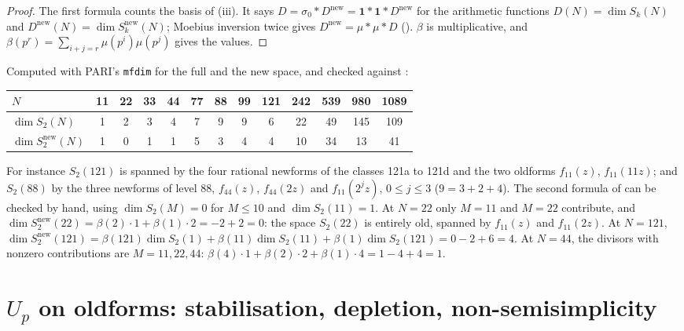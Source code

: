\begin{proof}
The first formula counts the basis of (iii). It says $D=\sigma_0*D^{\mathrm{new}}=\mathbf1*\mathbf1*D^{\mathrm{new}}$ for the arithmetic functions $D(N)=\dim S_k(N)$ and
$D^{\mathrm{new}}(N)=\dim S_k^{\mathrm{new}}(N)$; Moebius inversion twice gives $D^{\mathrm{new}}=\mu*\mu*D$ (). $\beta$ is multiplicative, and $\beta(p^r)=\sum_{i+j=r}\mu(p^i)\mu(p^j)$ gives the values.
\end{proof}

\begin{example}\label{ex:hecke:dimensions}
Computed with PARI's \texttt{mfdim} for the full and the new space, and checked against :
\begin{center}
\begin{tabular}{lcccccccccccc}
\toprule
$N$ & 11 & 22 & 33 & 44 & 77 & 88 & 99 & 121 & 242 & 539 & 980 & 1089\\
\midrule
$\dim S_2(N)$ & 1 & 2 & 3 & 4 & 7 & 9 & 9 & 6 & 22 & 49 & 145 & 109\\
$\dim S_2^{\mathrm{new}}(N)$ & 1 & 0 & 1 & 1 & 5 & 3 & 4 & 4 & 10 & 34 & 13 & 41\\
\bottomrule
\end{tabular}
\end{center}
For instance $S_2(121)$ is spanned by the four rational newforms of the classes 121a to 121d and the two oldforms $f_{11}(z)$, $f_{11}(11z)$; and $S_2(88)$ by the three newforms of
level $88$, $f_{44}(z)$, $f_{44}(2z)$ and $f_{11}(2^jz)$, $0\le j\le3$ ($9=3+2+4$). The second formula of  can be checked by hand, using $\dim S_2(M)=0$
for $M\le10$ and $\dim S_2(11)=1$. At $N=22$ only $M=11$ and $M=22$ contribute, and $\dim S_2^{\mathrm{new}}(22)=\beta(2)\cdot1+\beta(1)\cdot2=-2+2=0$: the space $S_2(22)$ is entirely
old, spanned by $f_{11}(z)$ and $f_{11}(2z)$. At $N=121$, $\dim S_2^{\mathrm{new}}(121)=\beta(121)\dim S_2(1)+\beta(11)\dim S_2(11)+\beta(1)\dim S_2(121)=0-2+6=4$. At $N=44$, the divisors
with nonzero contributions are $M=11,22,44$: $\beta(4)\cdot1+\beta(2)\cdot2+\beta(1)\cdot4=1-4+4=1$.
\end{example}

\section{$U_p$ on oldforms: stabilisation, depletion, non-semisimplicity}\label{sec:hecke:Up}

